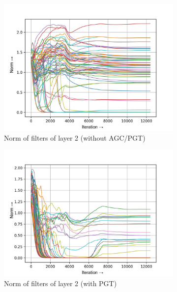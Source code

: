 \documentclass[times,sort&compress]{elsarticle}
\begin{document}
\begin{figure}[t]
\begin{subfigure}[t]{0.32\textwidth}
\includegraphics[width=\linewidth]{baseline-w-layer-1-2}
\caption{Norm of filters of layer 2 (without AGC/PGT)}
\end{subfigure}
\begin{subfigure}[t]{0.32\textwidth}
\includegraphics[width=\linewidth]{pgt-w-layer-1-2}
\caption{Norm of filters of layer 2 (with PGT)}
\end{subfigure}
\begin{subfigure}[t]{0.32\textwidth}

\end{subfigure}
\end{figure}
\end{document}
